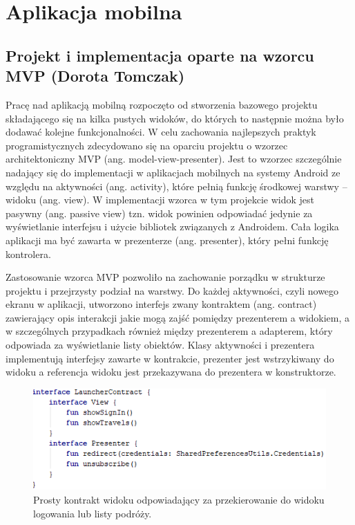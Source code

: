 \documentclass[10pt,twoside,a4paper]{report}
\begin{document}
\chapter{Aplikacja mobilna}

\section{Projekt i implementacja oparte na wzorcu MVP (Dorota Tomczak)}
\par Pracę nad aplikacją mobilną rozpoczęto od stworzenia bazowego projektu składającego się na kilka pustych widoków, do których to następnie można było dodawać kolejne funkcjonalności. W celu zachowania najlepszych praktyk programistycznych zdecydowano się na oparciu projektu o wzorzec architektoniczny MVP (ang. model-view-presenter). Jest to wzorzec szczególnie nadający się do implementacji w aplikacjach mobilnych na systemy Android ze względu na aktywności (ang. activity), które pełnią funkcję środkowej warstwy – widoku (ang. view). W implementacji wzorca w tym projekcie widok jest pasywny (ang. passive view) tzn. widok powinien odpowiadać jedynie za wyświetlanie interfejsu i użycie bibliotek związanych z Androidem. Cała logika aplikacji ma być zawarta w prezenterze (ang. presenter), który pełni funkcję kontrolera.

\par Zastosowanie wzorca MVP pozwoliło na zachowanie porządku w strukturze projektu i przejrzysty podział na warstwy. Do każdej aktywności, czyli nowego ekranu w aplikacji, utworzono interfejs zwany kontraktem (ang. contract) zawierający opis interakcji jakie mogą zajść pomiędzy prezenterem a widokiem, a w szczególnych przypadkach również między prezenterem a adapterem, który odpowiada za wyświetlanie listy obiektów. Klasy aktywności i prezentera implementują interfejsy zawarte w kontrakcie, prezenter jest wstrzykiwany do widoku a referencja widoku jest przekazywana do prezentera w konstruktorze.

\begin{figure}[h]
\centering
\includegraphics[width=\linewidth]{launcherContract}
\caption{Prosty kontrakt widoku odpowiadający za przekierowanie do widoku logowania lub listy podróży.}
\label{fig:launcherContract}
\end{figure}
\end{document}
